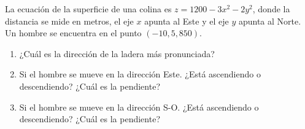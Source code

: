 \documentclass[a4,11pt]{aleph-examen}
\begin{document}
\begin{preguntas}
\begin{respuesta}
\begin{respuesta}




\item 
    La ecuación de la superficie de una colina es $z = 1200 - 3x^2 - 2y^2$, donde la distancia se mide en metros, el eje $x$ apunta al Este y el eje $y$ apunta al Norte. Un hombre se encuentra en el punto $(-10, 5, 850)$.
    \begin{enumerate}
        \item ¿Cuál es la dirección de la ladera más pronunciada?
        \item Si el hombre se mueve en la dirección Este. ¿Está ascendiendo o descendiendo? ¿Cuál es la pendiente?
        \item Si el hombre se mueve en la dirección S-O. ¿Está ascendiendo o descendiendo? ¿Cuál es la pendiente?
    \end{enumerate}


\end{respuesta}
\end{respuesta}
\end{preguntas}
\end{document}
